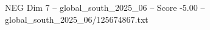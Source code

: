 \begin{textsample}{NEG Dim 7 – global\_south\_2025\_06 – Score -5.00 – global\_south\_2025\_06/125674867.txt}
\end{textsample}
